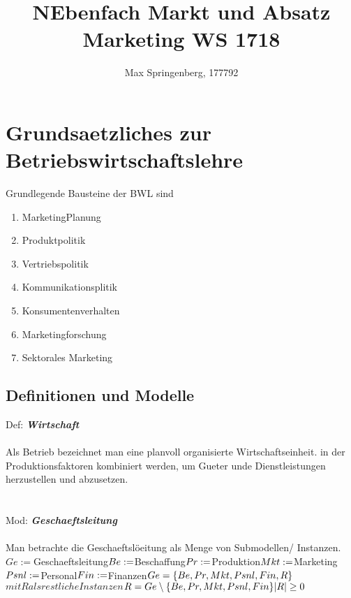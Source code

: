 \documentclass{article}
\author{Max Springenberg, 177792}
\title{
    NEbenfach Markt und Absatz\\
    Marketing WS 1718
}
\date{}
\newcommand{\gap}{\\ \ \\}
\newcommand{\headline}[1]{\textbf{\textit{#1}}\\}
\begin{document}
\maketitle
\section{Grundsaetzliches zur Betriebswirtschaftslehre}
Grundlegende Bausteine der BWL sind\\
\begin{enumerate}
    \item MarketingPlanung
    \item Produktpolitik
    \item Vertriebspolitik
    \item Kommunikationsplitik
    \item Konsumentenverhalten
    \item Marketingforschung
    \item Sektorales Marketing
\end{enumerate}
\subsection{Definitionen und Modelle}
Def: \headline{Wirtschaft}
\\
Als Betrieb bezeichnet man eine planvoll organisierte Wirtschaftseinheit.
in der Produktionsfaktoren kombiniert werden, um Gueter unde Dienstleistungen herzustellen und 
abzusetzen.\\
\gap
Mod: \headline{Geschaeftsleitung}
\\
Man betrachte die Geschaeftslöeitung als Menge von Submodellen/ Instanzen.\\
$
Ge      := $Geschaeftsleitung$\\
Be      := $Beschaffung$\\
Pr      := $Produktion$\\
Mkt     := $Marketing$\\
Psnl    := $Personal$\\
Fin     := $Finanzen$\\
\gap
Ge = \{
    Be, Pr, Mkt, Psnl, Fin, R
\}
$$mit R als restliche Instanzen$$\\
R = Ge \setminus \{
    Be, Pr, Mkt, Psnl, Fin
\}\\
|R| \geq 0\\
$
\end{document}
